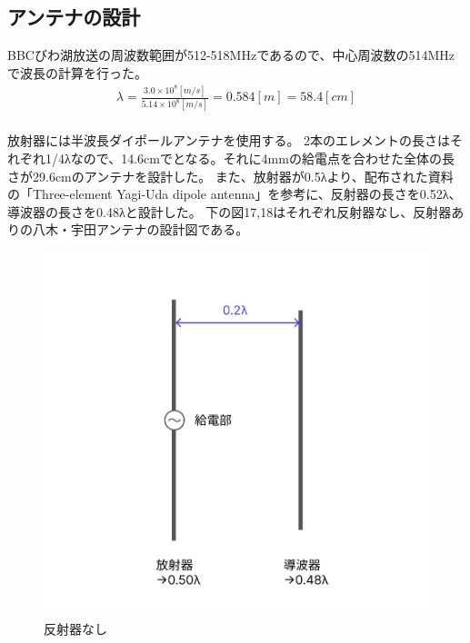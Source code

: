 \documentclass[dvipdfmx,autodetect-engine,titlepage]{jsarticle}
\begin{document}
\subsection{アンテナの設計}
BBCびわ湖放送の周波数範囲が512-518MHzであるので、中心周波数の514MHzで波長の計算を行った。
\begin{eqnarray*}
  \lambda = \frac{3.0 \times 10^8 [m/s]}{5.14 \times 10^8 [m/s]} = 0.584[m] = 58.4[cm]\\
\end{eqnarray*}

放射器には半波長ダイポールアンテナを使用する。
2本のエレメントの長さはそれぞれ1/4λなので、14.6cmでとなる。それに4mmの給電点を合わせた全体の長さが29.6cmのアンテナを設計した。
また、放射器が0.5λより、配布された資料の「Three-element Yagi-Uda dipole antenna」を参考に、反射器の長さを0.52λ、導波器の長さを0.48λと設計した。
下の図17,18はそれぞれ反射器なし、反射器ありの八木・宇田アンテナの設計図である。\\

\begin{figure}[H]
  \centering
  \includegraphics[scale=0.28]{yagiuda.png}
  \caption{反射器なし}\label{fig:図19}
\end{figure}
\end{document}
